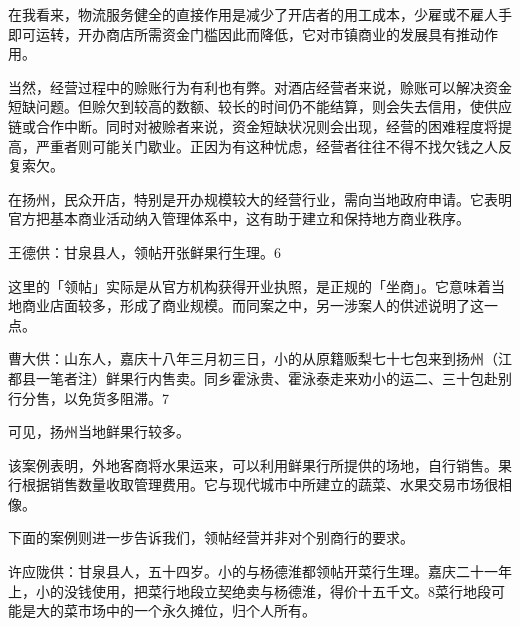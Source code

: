 在我看来，物流服务健全的直接作用是减少了开店者的用工成本，少雇或不雇人手即可运转，开办商店所需资金门槛因此而降低，它对市镇商业的发展具有推动作用。

当然，经营过程中的赊账行为有利也有弊。对酒店经营者来说，赊账可以解决资金短缺问题。但赊欠到较高的数额、较长的时间仍不能结算，则会失去信用，使供应链或合作中断。同时对被赊者来说，资金短缺状况则会出现，经营的困难程度将提高，严重者则可能关门歇业。正因为有这种忧虑，经营者往往不得不找欠钱之人反复索欠。

\vfill
\begin{BookNotes}
\end{BookNotes}


在扬州，民众开店，特别是开办规模较大的经营行业，需向当地政府申请。它表明官方把基本商业活动纳入管理体系中，这有助于建立和保持地方商业秩序。

\begin{BookQuote}
王德供：甘泉县人，领帖开张鲜果行生理。6
\end{BookQuote}

这里的「领帖」实际是从官方机构获得开业执照，是正规的「坐商」。它意味着当地商业店面较多，形成了商业规模。而同案之中，另一涉案人的供述说明了这一点。

\begin{BookQuote}
曹大供：山东人，嘉庆十八年三月初三日，小的从原籍贩梨七十七包来到扬州（江都县一笔者注）鲜果行内售卖。同乡霍泳贵、霍泳泰走来劝小的运二、三十包赴别行分售，以免货多阻滞。7
\end{BookQuote}

可见，扬州当地鲜果行较多。

该案例表明，外地客商将水果运来，可以利用鲜果行所提供的场地，自行销售。果行根据销售数量收取管理费用。它与现代城市中所建立的蔬菜、水果交易市场很相像。

下面的案例则进一步告诉我们，领帖经营并非对个别商行的要求。

\begin{BookQuote}
许应陇供：甘泉县人，五十四岁。小的与杨德淮都领帖开菜行生理。嘉庆二十一年上，小的没钱使用，把菜行地段立契绝卖与杨德淮，得价十五千文。8菜行地段可能是大的菜市场中的一个永久摊位，归个人所有。
\end{BookQuote}

